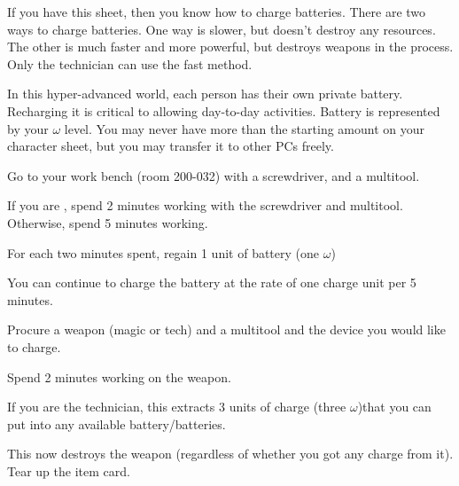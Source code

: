 \documentclass[green]{guildcamp3}
\begin{document}
\name{\gBatterycharge{}}



If you have this sheet, then you know how to charge batteries. There are two ways to charge batteries. One way is slower, but doesn't destroy any resources. The other is much faster and more powerful, but destroys weapons in the process. Only the technician can use the fast method. 

In this hyper-advanced world, each person has their own private battery. Recharging it is critical to allowing day-to-day activities. Battery is represented by your $\omega$ level. You may never have more than the starting amount on your character sheet, but you may transfer it to other PCs freely.


\begin{enum}
  \item Go to your work bench (room 200-032) with a screwdriver, and a multitool.
  \item If you are \cTech{}, spend 2 minutes working with the screwdriver and multitool. Otherwise, spend 5 minutes working.
  \item For each two minutes spent, regain 1 unit of battery (one $\omega$)
  \item You can continue to charge the battery at the rate of one charge unit per 5 minutes. 
\end{enum}

\begin{enum}
	\item Procure a weapon (magic or tech) and a multitool and the device you would like to charge.
	\item Spend 2 minutes working on the weapon. 
	\item If you are the technician, this extracts 3 units of charge (three $\omega$)that you can put into any available battery/batteries. 
	\item This now destroys the weapon (regardless of whether you got any charge from it). Tear up the item card. 
\end{enum}
\end{document}
